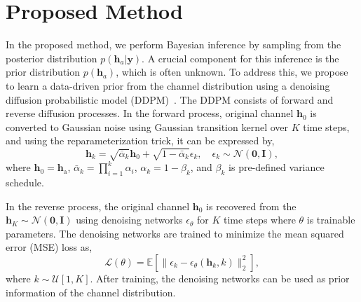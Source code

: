 \documentclass[lettersize,journal]{IEEEtran}
\begin{document}
\section{Proposed Method}

In the proposed method, we perform Bayesian inference by sampling from the posterior distribution $p(\mathbf{h}_{a}|\mathbf{y})$. A crucial component for this inference is the prior distribution $p(\mathbf{h}_{a})$, which is often unknown. To address this, we propose to learn a data-driven prior from the channel distribution using a denoising diffusion probabilistic model (DDPM)~\cite{hoDenoisingDiffusionProbabilistic2020}. The DDPM consists of forward and reverse diffusion processes. In the forward process, original channel $\mathbf{h}_{0}$ is converted to Gaussian noise using Gaussian transition kernel over $K$ time steps, and using the reparameterization trick, it can be expressed by,
\begin{equation}
\mathbf{h}_{k} = \sqrt{ \bar{\alpha}_{k} }\mathbf{h}_{0} + \sqrt{ 1-\bar{\alpha}_{k} }\epsilon_{k},\quad \epsilon_{k}\sim\mathcal{N}(\mathbf{0},\mathbf{I}),
\end{equation}
where $\mathbf{h}_{0} = \mathbf{h}_{\text{a}}$, $\bar{\alpha}_{k}=\prod_{i=1}^{k}\alpha_{i}$, $\alpha_{k}=1-\beta_{k}$, and $\beta_{k}$ is pre-defined variance schedule.

In the reverse process, the original channel $\mathbf{h}_{0}$ is recovered from the $\mathbf{h}_{K}\sim\mathcal{N}(\mathbf{0},\mathbf{I})$ using denoising networks $\epsilon_{\theta}$ for $K$ time steps where $\theta$ is trainable parameters. The denoising networks are trained to minimize the mean squared error (MSE) loss as,
\begin{equation}
\mathcal{L}(\theta) = \mathbb{E}[\|\epsilon_{k} - \epsilon_{\theta}(\mathbf{h}_{k},k)\|_{2}^{2}],
\end{equation}
where $k\sim\mathcal{U}[1,K]$. After training, the denoising networks can be used as prior information of the channel distribution.
\end{document}
